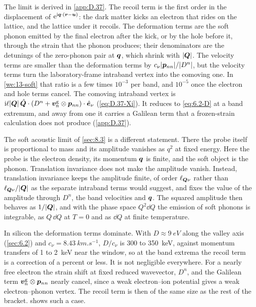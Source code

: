 \noindent The limit is derived in \cref{app:D.37}. The recoil term is the first order in the displacement of $\mathrm{e}^{\mathrm{i}\bm{q}\cdot(\bm{r} - \bm{u})}$: the dark matter kicks an electron that rides on the lattice, and the lattice under it recoils. The deformation terms are the soft phonon emitted by the final electron after the kick, or by the hole before it, through the strain that the phonon produces; their denominators are the detunings of the zero-phonon pair at $\bm{q}$, which shrink with $|\bm{Q}|$. The velocity terms are smaller than the deformation terms by $c_\nu|\bm{p}_{nn}|/|D^n|$, but the velocity terms turn the laboratory-frame intraband vertex into the comoving one. In \cref{we:13-soft} that ratio is a few times $10^{-3}$ per band, and $10^{-5}$ once the electron and hole terms cancel. The comoving intraband vertex is $\mathrm{i}\ell|\bm{Q}|\,\hat{\bm{Q}}\cdot(D^n + \bm{v}^{\mathrm{g}}_n\otimes\bm{p}_{nn})\cdot\hat{\bm{e}}_\nu$ (\cref{eq:D.37-Xi}). It reduces to \cref{eq:6.2-D} at a band extremum, and away from one it carries a Galilean term that a frozen-strain calculation does not produce (\cref{app:D.37}).

The soft acoustic limit of \cref{sec:8.3} is a different statement. There the probe itself is proportional to mass and its amplitude vanishes as $q^2$ at fixed energy. Here the probe is the electron density, its momentum $\bm{q}$ is finite, and the soft object is the phonon. Translation invariance does not make the amplitude vanish. Instead, translation invariance keeps the amplitude finite, of order $\ell_{\bm{Q}\nu}$ rather than $\ell_{\bm{Q}\nu}/|\bm{Q}|$ as the separate intraband terms would suggest, and fixes the value of the amplitude through $D^n$, the band velocities and $\bm{q}$. The squared amplitude then behaves as $1/|\bm{Q}|$, and with the phase space $Q^2\dd Q$ the emission of soft phonons is integrable, as $Q\,\dd Q$ at $T = 0$ and as $\dd Q$ at finite temperature.

In silicon the deformation terms dominate. With $D \approx \SI{9}{eV}$ along the valley axis (\cref{sec:6.2}) and $c_\nu = \SI{8.43}{km.s^{-1}}$, $D/c_\nu$ is 300 to \SI{350}{keV}, against momentum transfers of 1 to \SI{2}{keV} near the window, so at the band extrema the recoil term is a correction of a percent or less. It is not negligible everywhere. For a nearly free electron the strain shift at fixed reduced wavevector, $D^n$, and the Galilean term $\bm{v}^{\mathrm{g}}_n\otimes\bm{p}_{nn}$ nearly cancel, since a weak electron--ion potential gives a weak electron--phonon vertex. The recoil term is then of the same size as the rest of the bracket.  shows such a case.

